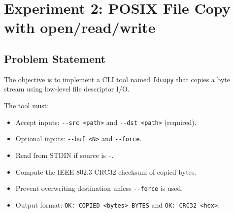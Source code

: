 
\section{Experiment 2: POSIX File Copy with open/read/write}

\subsection{Problem Statement}
The objective is to implement a CLI tool named \texttt{fdcopy} that copies a byte stream using low-level file descriptor I/O.

The tool must:
\begin{itemize}
    \item Accept inputs: \verb|--src <path>| and \verb|--dst <path>| (required).
    \item Optional inputs: \verb|--buf <N>| and \verb|--force|.
    \item Read from STDIN if source is \verb|-|.
    \item Compute the IEEE 802.3 CRC32 checksum of copied bytes.
    \item Prevent overwriting destination unless \verb|--force| is used.
    \item Output format: \verb|OK: COPIED <bytes> BYTES| and \verb|OK: CRC32 <hex>|.
\end{itemize}


